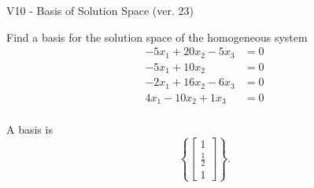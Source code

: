 \begin{exercise}
  \begin{exerciseTitle}V10 - Basis of Solution Space (ver. 23)\end{exerciseTitle}
  \begin{exerciseStatement}
    Find a basis for the solution space of the homogeneous system 
\begin{align*}
 -5 x_ 1 + 20 x_ 2 -5 x_ 3 &= 0  \\ 
  -5 x_ 1 + 10 x_ 2 &= 0  \\ 
  -2 x_ 1 + 16 x_ 2 -6 x_ 3 &= 0  \\ 
  4 x_ 1 -10 x_ 2 + 1 x_ 3 &= 0  \\ 
 \end{align*}


 
  \end{exerciseStatement}

  \begin{exerciseAnswer}
   A basis is   
\[\left\{\left[\begin{array}{c}
1 \\
\frac{1}{2} \\
1
\end{array}\right]\right\}.\]

  


  \end{exerciseAnswer}
\end{exercise}